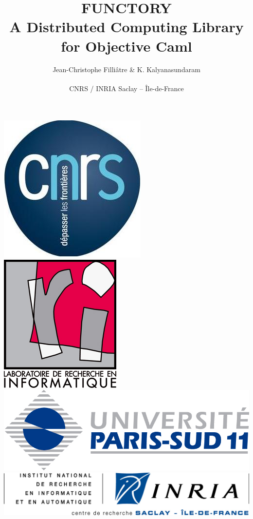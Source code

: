 \documentclass[xcolor=dvipsnames]{beamer}
\begin{document}

\title{FUNCTORY \\ A Distributed Computing Library \\ for Objective Caml}

\author[Kalyan]{Jean-Christophe Filli\^{a}tre \& K. Kalyanasundaram\\
  \- \\ 
  CNRS / INRIA Saclay -- \^{I}le-de-France}
\date {}


\begin{frame}
  \titlepage
  \begin{center}
    \includegraphics[scale=0.11]{cnrs-logo2.jpg}
    \hspace{4mm}
    \includegraphics[scale=0.09]{lrilogo.jpg}
    \hspace{4mm}
    \includegraphics[scale=0.09]{upsudlogo.jpg}
    \hspace{4mm}
    \includegraphics[scale=0.4]{inria-saclay.jpeg}
  \end{center}
\end{frame}
\end{document}
